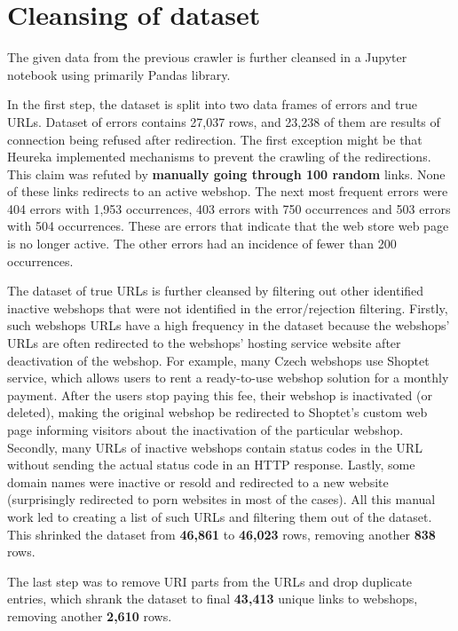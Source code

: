 \section{Cleansing of dataset}

The given data from the previous crawler is further cleansed in a Jupyter notebook using primarily Pandas library.

In the first step, the dataset is split into two data frames of errors and true URLs. Dataset of errors contains 27,037 rows, and 23,238 of them are results of connection being refused after redirection. The first exception might be that Heureka implemented mechanisms to prevent the crawling of the redirections. This claim was refuted by \textbf{manually going through 100 random} links. None of these links redirects to an active webshop. The next most frequent errors were 404 errors with 1,953 occurrences, 403 errors with 750 occurrences and 503 errors with 504 occurrences. These are errors that indicate that the web store web page is no longer active. The other errors had an incidence of fewer than 200 occurrences.

The dataset of true URLs is further cleansed by filtering out other identified inactive webshops that were not identified in the error/rejection filtering. Firstly, such webshops URLs have a high frequency in the dataset because the webshops' URLs are often redirected to the webshops' hosting service website after deactivation of the webshop. For example, many Czech webshops use Shoptet service, which allows users to rent a ready-to-use webshop solution for a monthly payment. After the users stop paying this fee, their webshop is inactivated (or deleted), making the original webshop be redirected to Shoptet's custom web page informing visitors about the inactivation of the particular webshop. Secondly, many URLs of inactive webshops contain status codes in the URL without sending the actual status code in an HTTP response. Lastly, some domain names were inactive or resold and redirected to a new website (surprisingly redirected to porn websites in most of the cases). All this manual work led to creating a list of such URLs and filtering them out of the dataset. This shrinked the dataset from \textbf{46,861} to \textbf{46,023} rows, removing another \textbf{838} rows.

The last step was to remove URI parts from the URLs and drop duplicate entries, which shrank the dataset to final \textbf{43,413} unique links to webshops, removing another \textbf{2,610} rows.


